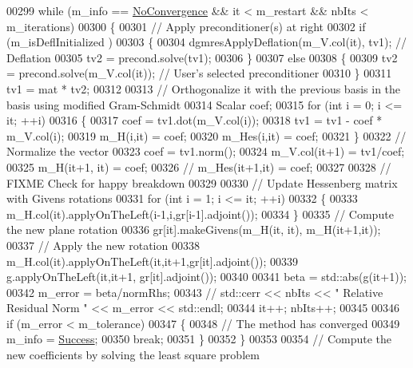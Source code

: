 \begin{DoxyCode}
00299   \textcolor{keywordflow}{while} (m\_info == \hyperlink{group__enums_gga85fad7b87587764e5cf6b513a9e0ee5eaba1c8763d1179778070f365ecc4157a8}{NoConvergence} && it < m\_restart && nbIts < m\_iterations)
00300   \{    
00301     \textcolor{comment}{// Apply preconditioner(s) at right}
00302     \textcolor{keywordflow}{if} (m\_isDeflInitialized )
00303     \{
00304       dgmresApplyDeflation(m\_V.col(it), tv1); \textcolor{comment}{// Deflation}
00305       tv2 = precond.solve(tv1); 
00306     \}
00307     \textcolor{keywordflow}{else}
00308     \{
00309       tv2 = precond.solve(m\_V.col(it)); \textcolor{comment}{// User's selected preconditioner}
00310     \}
00311     tv1 = mat * tv2; 
00312    
00313     \textcolor{comment}{// Orthogonalize it with the previous basis in the basis using modified Gram-Schmidt}
00314     Scalar coef; 
00315     \textcolor{keywordflow}{for} (\textcolor{keywordtype}{int} i = 0; i <= it; ++i)
00316     \{ 
00317       coef = tv1.dot(m\_V.col(i));
00318       tv1 = tv1 - coef * m\_V.col(i); 
00319       m\_H(i,it) = coef; 
00320       m\_Hes(i,it) = coef; 
00321     \}
00322     \textcolor{comment}{// Normalize the vector }
00323     coef = tv1.norm(); 
00324     m\_V.col(it+1) = tv1/coef;
00325     m\_H(it+1, it) = coef;
00326 \textcolor{comment}{//     m\_Hes(it+1,it) = coef; }
00327     
00328     \textcolor{comment}{// FIXME Check for happy breakdown }
00329     
00330     \textcolor{comment}{// Update Hessenberg matrix with Givens rotations}
00331     \textcolor{keywordflow}{for} (\textcolor{keywordtype}{int} i = 1; i <= it; ++i) 
00332     \{
00333       m\_H.col(it).applyOnTheLeft(i-1,i,gr[i-1].adjoint());
00334     \}
00335     \textcolor{comment}{// Compute the new plane rotation }
00336     gr[it].makeGivens(m\_H(it, it), m\_H(it+1,it)); 
00337     \textcolor{comment}{// Apply the new rotation}
00338     m\_H.col(it).applyOnTheLeft(it,it+1,gr[it].adjoint());
00339     g.applyOnTheLeft(it,it+1, gr[it].adjoint()); 
00340     
00341     beta = std::abs(g(it+1));
00342     m\_error = beta/normRhs; 
00343     \textcolor{comment}{// std::cerr << nbIts << " Relative Residual Norm " << m\_error << std::endl;}
00344     it++; nbIts++; 
00345     
00346     \textcolor{keywordflow}{if} (m\_error < m\_tolerance)
00347     \{
00348       \textcolor{comment}{// The method has converged}
00349       m\_info = \hyperlink{group__enums_gga85fad7b87587764e5cf6b513a9e0ee5ea52581b035f4b59c203b8ff999ef5fcea}{Success};
00350       \textcolor{keywordflow}{break};
00351     \}
00352   \}
00353   
00354   \textcolor{comment}{// Compute the new coefficients by solving the least square problem}

\end{DoxyCode}

